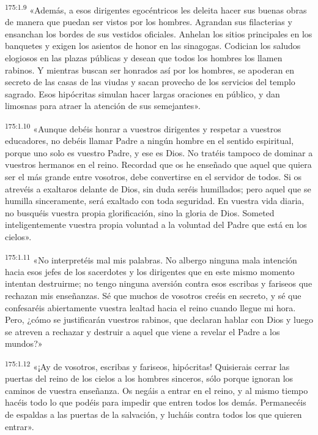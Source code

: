 \par 
\textsuperscript{175:1.9} «Además, a esos dirigentes egocéntricos les deleita hacer sus buenas obras de manera que puedan ser vistos por los hombres. Agrandan sus filacterias y ensanchan los bordes de sus vestidos oficiales. Anhelan los sitios principales en los banquetes y exigen los asientos de honor en las sinagogas. Codician los saludos elogiosos en las plazas públicas y desean que todos los hombres los llamen rabinos. Y mientras buscan ser honrados así por los hombres, se apoderan en secreto de las casas de las viudas y sacan provecho de los servicios del templo sagrado. Esos hipócritas simulan hacer largas oraciones en público, y dan limosnas para atraer la atención de sus semejantes».

\par 
\textsuperscript{175:1.10} «Aunque debéis honrar a vuestros dirigentes y respetar a vuestros educadores, no debéis llamar Padre a ningún hombre en el sentido espiritual, porque uno solo es vuestro Padre, y ese es Dios. No tratéis tampoco de dominar a vuestros hermanos en el reino. Recordad que os he enseñado que aquel que quiera ser el más grande entre vosotros, debe convertirse en el servidor de todos. Si os atrevéis a exaltaros delante de Dios, sin duda seréis humillados; pero aquel que se humilla sinceramente, será exaltado con toda seguridad. En vuestra vida diaria, no busquéis vuestra propia glorificación, sino la gloria de Dios. Someted inteligentemente vuestra propia voluntad a la voluntad del Padre que está en los cielos».

\par 
\textsuperscript{175:1.11} «No interpretéis mal mis palabras. No albergo ninguna mala intención hacia esos jefes de los sacerdotes y los dirigentes que en este mismo momento intentan destruirme; no tengo ninguna aversión contra esos escribas y fariseos que rechazan mis enseñanzas. Sé que muchos de vosotros creéis en secreto, y sé que confesaréis abiertamente vuestra lealtad hacia el reino cuando llegue mi hora. Pero, ¿cómo se justificarán vuestros rabinos, que declaran hablar con Dios y luego se atreven a rechazar y destruir a aquel que viene a revelar el Padre a los mundos?»

\par 
\textsuperscript{175:1.12} «¡Ay de vosotros, escribas y fariseos, hipócritas! Quisierais cerrar las puertas del reino de los cielos a los hombres sinceros, sólo porque ignoran los caminos de vuestra enseñanza. Os negáis a entrar en el reino, y al mismo tiempo hacéis todo lo que podéis para impedir que entren todos los demás. Permanecéis de espaldas a las puertas de la salvación, y lucháis contra todos los que quieren entrar».

